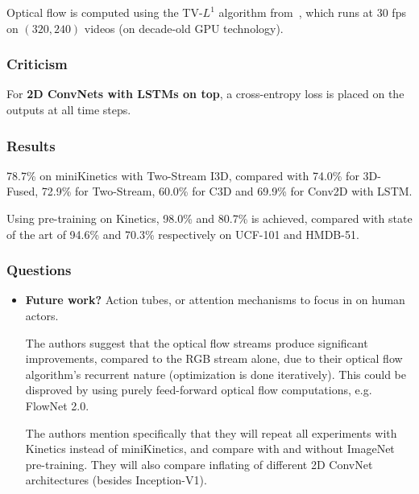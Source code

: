 \documentclass[a4paper, 12pt]{article}
\begin{document}
Optical flow is computed using the TV-$L^1$ algorithm
from~\citet{Zach07aduality}, which runs at 30 fps on $(320, 240)$ videos (on
decade-old GPU technology).

\subsubsection{Criticism}

For \textbf{2D ConvNets with LSTMs on top}, a cross-entropy loss is placed on
the outputs at all time steps.

\subsubsection{Results}

78.7\% on miniKinetics with Two-Stream I3D, compared with 74.0\% for 3D-Fused,
72.9\% for Two-Stream, 60.0\% for C3D and 69.9\% for Conv2D with LSTM\@.

Using pre-training on Kinetics, 98.0\% and 80.7\% is achieved, compared with
state of the art of 94.6\% and 70.3\% respectively on UCF-101 and HMDB-51.


\subsubsection{Questions}

\begin{itemize}
        \item \textbf{Future work?} Action tubes, or attention mechanisms to
                focus in on human actors.

                The authors suggest that the optical flow streams produce
                significant improvements, compared to the RGB stream alone, due
                to their optical flow algorithm's recurrent nature
                (optimization is done iteratively).  This could be disproved by
                using purely feed-forward optical flow computations, e.g.
                FlowNet 2.0.

                The authors mention specifically that they will repeat all
                experiments with Kinetics instead of miniKinetics, and compare
                with and without ImageNet pre-training. They will also compare
                inflating of different 2D ConvNet architectures (besides
                Inception-V1).
\end{itemize}
\end{document}
